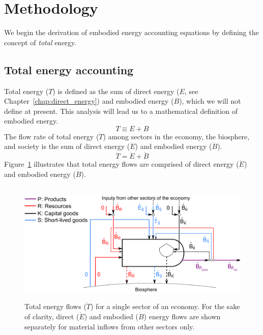 \section{Methodology}
\label{sec:embodied_methodology}

We begin the derivation of embodied energy accounting
equations by defining the concept of 
\emph{total} energy. 


\subsection{Total energy accounting}
\label{sec:total_energy_accounting}

Total energy ($T$)
is defined as the sum of 
direct energy
($E$, see Chapter~\ref{chap:direct_energy}) 
and embodied energy ($B$),
which we will not define at present.
This analysis will lead us to a mathematical definition of embodied energy.
%
\begin{equation} \label{eq:T_def}
	T \equiv E + B
\end{equation}
%
The flow rate of total energy 
($\dot{T}$) among sectors in 
the economy, the biosphere, and society is the sum of
direct energy ($\dot{E}$) and embodied 
energy ($\dot{B}$).
%
\begin{equation} \label{eq:T_dot_def}
	\dot{T} = \dot{E} + \dot{B}
\end{equation}
%
\noindent Figure~\ref{fig:embodied_single_producer} illustrates
that total energy flows are comprised of
direct energy ($\dot{E}$) and embodied energy ($\dot{B}$). 

\begin{figure}[!ht]
	\centering\
	\includegraphics[width=\textwidth]{Part_1/Chapter_Embodied/images/PERKS_basic_unit_embodied_energy_content.pdf}
	\caption[Total energy flows for a single sector]{Total energy flows 
	($\dot{T}$) for a single sector of an economy. 
	For the sake of clarity, 
	direct ($\dot{E}$) and embodied ($\dot{B}$) energy flows
	are shown separately for material inflows from other sectors only.
}
\label{fig:embodied_single_producer}
\end{figure}

